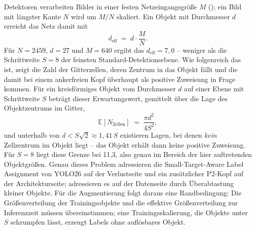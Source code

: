 Detektoren verarbeiten Bilder in einer festen Netzeingangsgröße $M$
(); ein Bild mit längster Kante $N$ wird um $M/N$ skaliert. Ein
Objekt mit Durchmesser $d$ erreicht das Netz damit mit
\begin{equation}
d_{\text{eff}} \;=\; d \cdot \frac{M}{N} .
\label{eq:deff}
\end{equation}
Für $N = 2459$, $d = 27$\px{} und $M = 640$ ergibt das
$d_{\text{eff}} = 7{,}0$\px{} -- weniger als die Schrittweite $S = 8$ der
feinsten Standard-Detektionsebene. Wie folgenreich das ist, zeigt die Zahl der
Gitterzellen, deren Zentrum in das Objekt fällt und die damit bei einem
ankerfreien Kopf überhaupt als positive Zuweisung in Frage kommen. Für ein
kreisförmiges Objekt vom Durchmesser $d$ auf einer Ebene mit Schrittweite $S$
beträgt dieser Erwartungswert, gemittelt über die Lage des Objektzentrums im
Gitter,
\begin{equation}
\mathbb{E}[N_{\text{Zellen}}] \;=\; \frac{\pi d^2}{4 S^2} ,
\label{eq:zellen}
\end{equation}
und unterhalb von $d < S\sqrt{2} \approx 1{,}41\,S$ existieren Lagen, bei denen
\emph{kein} Zellzentrum im Objekt liegt -- das Objekt erhält dann keine positive
Zuweisung. Für $S = 8$ liegt diese Grenze bei 11,3\px, also genau im Bereich der
hier auftretenden Objektgrößen. Genau dieses Problem adressieren die
Small-Target-Aware Label Assignment von YOLO26 auf der Verlustseite und ein
zusätzlicher P2-Kopf auf der Architekturseite;
\textcite{kisantal2019} adressieren es auf der Datenseite durch Überabtastung
kleiner Objekte. Für die Augmentierung folgt daraus eine Randbedingung: Die
Größenverteilung der Trainingsobjekte und die effektive Größenverteilung zur
Inferenzzeit müssen übereinstimmen; eine Trainingsskalierung, die Objekte unter
$S$ schrumpfen lässt, erzeugt Labels ohne auflösbares Objekt.

